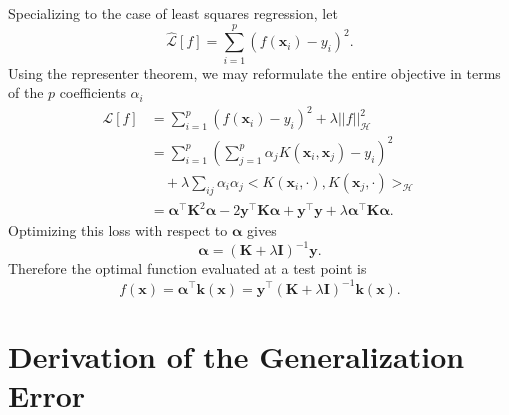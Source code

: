 \documentclass{article}
\begin{document}
Specializing to the case of least squares regression, let 
\begin{equation}
    \hat{\mathcal{L}}[f] = \sum_{i=1}^p (f(\mathbf{x}_i) - y_i)^2.
\end{equation}
%
Using the representer theorem, we may reformulate the entire objective in terms of the $p$ coefficients $\alpha_i$ 
\begin{align}
    \mathcal{L}[f] &= \sum_{i=1}^p (f(\mathbf{x}_i) - y_i)^2 + \lambda ||f||_{\mathcal{H}}^2 \nonumber
    \\
    &= \sum_{i=1}^p (\sum_{j=1}^p \alpha_j K(\mathbf{x}_i,\mathbf{x}_j) - y_i)^2 
    \nonumber \\
    &\quad + \lambda \sum_{ij}\alpha_i \alpha_j \Big< K(\mathbf{x}_i,\cdot), K(\mathbf{x}_j,\cdot) \Big>_{\mathcal{H}}
   \nonumber \\
   & = \bm{\alpha}^\top \mathbf{K}^2 \bm{\alpha} - 2 \mathbf{y}^\top \mathbf{K} \bm{\alpha} + \mathbf{y}^\top \mathbf{y} + \lambda \bm{\alpha}^\top \mathbf{K} \bm{\alpha}.
\end{align}
Optimizing this loss with respect to $\bm{\alpha}$ gives
\begin{equation}
    \bm{\alpha} = (\mathbf{K} + \lambda \mathbf{I})^{-1} \mathbf{y}.
\end{equation}
Therefore the optimal function evaluated at a test point is
\begin{equation}
    f(\mathbf{x}) = \bm{\alpha}^\top \mathbf{k}(\mathbf{x}) = \mathbf{y}^\top (\mathbf{K} + \lambda \mathbf{I})^{-1} \mathbf{k}(\mathbf{x}).
\end{equation}


\section{Derivation of the Generalization Error}\label{SIDerivGenErr}
\end{document}
